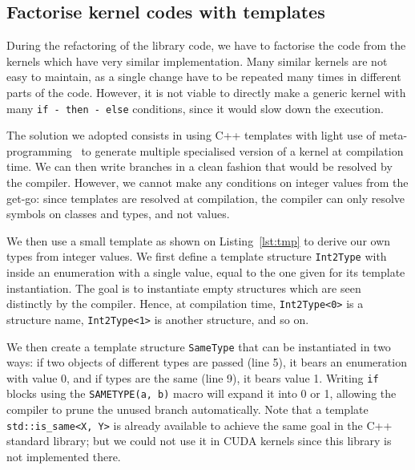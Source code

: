 
\subsection{Factorise kernel codes with templates}

During the refactoring of the library code, we have to factorise the code from the kernels which have very similar implementation. Many similar kernels are not easy to maintain, as a single change have to be repeated many times in different parts of the code. However, it is not viable to directly make a generic kernel with many \verb|if - then - else| conditions, since it would slow down the execution. 

The solution we adopted consists in using C++ templates with light use of meta-programming~\cite{wikibook:tmp} to generate multiple specialised version of a kernel at compilation time. We can then write branches in a clean fashion that would be resolved by the compiler. However, we cannot make any conditions on integer values from the get-go: since templates are resolved at compilation, the compiler can only resolve symbols on classes and types, and not values. 

We then use a small template as shown on Listing~\ref{lst:tmp} to derive our own types from integer values. We first define a template structure \verb|Int2Type| with inside an enumeration with a single value, equal to the one given for its template instantiation. The goal is to instantiate empty structures which are seen distinctly by the compiler. Hence, at compilation time, \verb|Int2Type<0>| is a structure name, \verb|Int2Type<1>| is another structure, and so on.

We then create a template structure \verb|SameType| that can be instantiated in two ways: if two objects of different types are passed (line 5), it bears an enumeration with value 0, and if types are the same (line 9), it bears value 1. Writing \verb|if| blocks using the \verb|SAMETYPE(a, b)| macro will expand it into 0 or 1, allowing the compiler to prune the unused branch automatically. Note that a template \verb|std::is_same<X, Y>| is already available to achieve the same goal in the C++ standard library; but we could not use it in CUDA kernels since this library is not implemented there.

